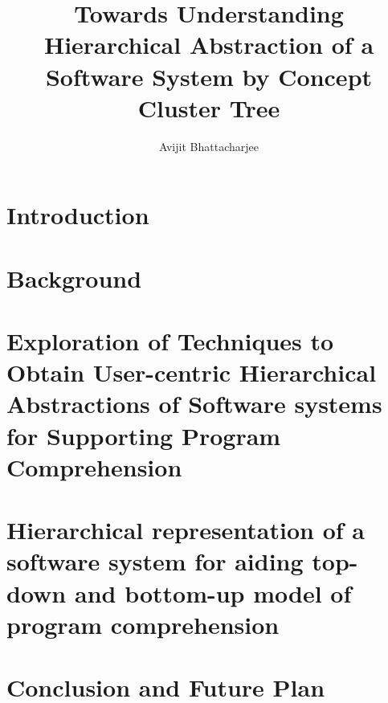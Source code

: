 \documentclass{uofsthesis-cs}
\title{Towards Understanding Hierarchical Abstraction of a Software System   by Concept Cluster Tree}
\author{Avijit Bhattacharjee}
\begin{document}
\maketitle

\frontmatter


\chapter{Introduction}




%
% 
% 
%


\chapter{Background}


\chapter{Exploration of Techniques to Obtain User-centric Hierarchical Abstractions of Software systems for Supporting Program Comprehension}


\chapter{Hierarchical representation of a software system  for aiding top-down and bottom-up model of program comprehension}


\chapter{Conclusion and Future Plan}

\end{document}

